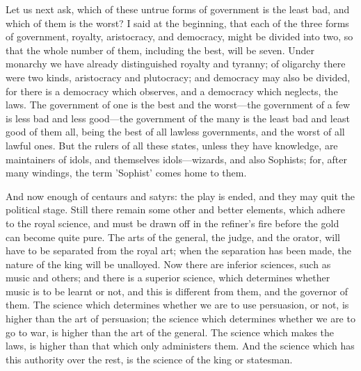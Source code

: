 \documentclass[11pt,letter]{article}
\begin{document}
\par  Let us next ask, which of these untrue forms of government is the least bad, and which of them is the worst? I said at the beginning, that each of the three forms of government, royalty, aristocracy, and democracy, might be divided into two, so that the whole number of them, including the best, will be seven. Under monarchy we have already distinguished royalty and tyranny; of oligarchy there were two kinds, aristocracy and plutocracy; and democracy may also be divided, for there is a democracy which observes, and a democracy which neglects, the laws. The government of one is the best and the worst—the government of a few is less bad and less good—the government of the many is the least bad and least good of them all, being the best of all lawless governments, and the worst of all lawful ones. But the rulers of all these states, unless they have knowledge, are maintainers of idols, and themselves idols—wizards, and also Sophists; for, after many windings, the term 'Sophist' comes home to them.

\par  And now enough of centaurs and satyrs: the play is ended, and they may quit the political stage. Still there remain some other and better elements, which adhere to the royal science, and must be drawn off in the refiner's fire before the gold can become quite pure. The arts of the general, the judge, and the orator, will have to be separated from the royal art; when the separation has been made, the nature of the king will be unalloyed. Now there are inferior sciences, such as music and others; and there is a superior science, which determines whether music is to be learnt or not, and this is different from them, and the governor of them. The science which determines whether we are to use persuasion, or not, is higher than the art of persuasion; the science which determines whether we are to go to war, is higher than the art of the general. The science which makes the laws, is higher than that which only administers them. And the science which has this authority over the rest, is the science of the king or statesman.
\end{document}
